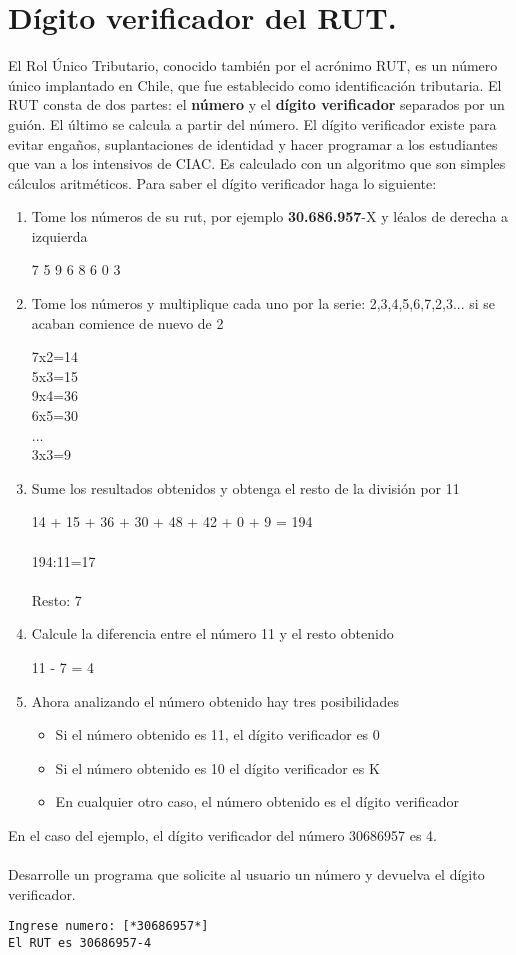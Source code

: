 \section{Dígito verificador del RUT.}

El Rol Único Tributario, conocido también por el acrónimo RUT, es un número único implantado en Chile, que fue establecido como identificación tributaria. El RUT consta de dos partes: el \textbf{número} y el \textbf{dígito verificador} separados por un guión. El último se calcula a partir del número. El dígito verificador existe para evitar engaños, suplantaciones de identidad y hacer programar a los estudiantes que van a los intensivos de CIAC. Es calculado con un algoritmo que son simples cálculos aritméticos. Para saber el dígito verificador haga lo siguiente:
\begin{enumerate}
	\item Tome los números de su rut, por ejemplo \textbf{30.686.957}-X y léalos de derecha a izquierda
	\begin{center}
		7 5 9 6 8 6 0 3
	\end{center}
	\item Tome los números y multiplique cada uno por la serie: 2,3,4,5,6,7,2,3... si se acaban comience de nuevo de 2
	\begin{center}
		7x2=14\\5x3=15\\9x4=36\\6x5=30\\...\\3x3=9
	\end{center}
	\item Sume los resultados obtenidos y obtenga el resto de la división por 11
	\begin{center}
		14 + 15 + 36 + 30 + 48 + 42 + 0 + 9 = 194\\ \\ 194:11=17\\ \\Resto: 7
	\end{center}
	\item Calcule la diferencia entre el número 11 y el resto obtenido
	\begin{center}
		11 - 7 = 4
	\end{center}
	\item Ahora analizando el número obtenido hay tres posibilidades
	\begin{itemize}
		\item Si el número obtenido es 11, el dígito verificador es 0
		\item Si el número obtenido es 10 el dígito verificador es K
		\item En cualquier otro caso, el número obtenido es el dígito verificador
	\end{itemize}
\end{enumerate}

En el caso del ejemplo, el dígito verificador del número 30686957 es 4.
\\ \\
Desarrolle un programa que solicite al usuario un número y devuelva el dígito verificador.
\begin{lstlisting}[style=consola]
Ingrese numero: [*30686957*]
El RUT es 30686957-4
\end{lstlisting}